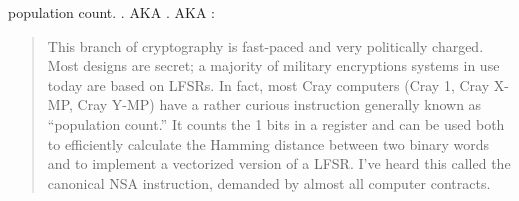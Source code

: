   \item[POPCNT] population count. 
  .
  \ac{AKA} .
  \ac{AKA}  :

\begin{framed}
\begin{quotation}
  This branch of cryptography is fast-paced and very politically charged.
  Most designs are secret; a majority of military encryptions systems in use today are 
  based on LFSRs. 
  In fact, most Cray computers (Cray 1, Cray X-MP, Cray Y-MP) have a rather curious 
  instruction generally known as “population count.” It counts the 1 bits in a register 
  and can be used both to efficiently calculate the Hamming distance between two binary 
  words and to implement a vectorized version of a LFSR. I’ve heard this called the canonical 
  NSA instruction, demanded by almost all computer contracts.
\end{quotation}
\end{framed}
\cite{Schneier}

